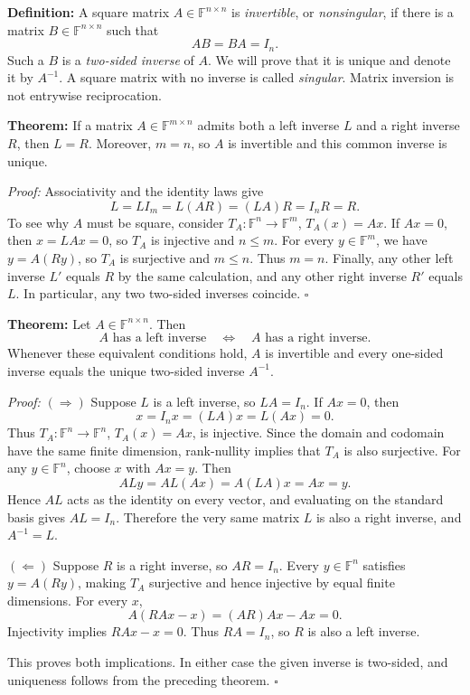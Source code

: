 \documentclass[a4paper,11pt,abstract=true]{scrartcl}
\theoremstyle{dotlessP}
\theoremstyle{dotlessS}
\theoremstyle{remark}
\theoremstyle{definition}
\begin{document}
\begin{definition_box}
\textbf{Definition:} A square matrix
$A\in\mathbb{F}^{n\times n}$ is \emph{invertible}, or
\emph{nonsingular}, if there is a matrix $B\in\mathbb{F}^{n\times n}$
such that
\[
AB=BA=I_n.
\]
Such a $B$ is a \emph{two-sided inverse} of $A$. We will prove that it
is unique and denote it by $A^{-1}$. A square matrix with no inverse is
called \emph{singular}. Matrix inversion is not entrywise reciprocation.
\end{definition_box}

\begin{problem_box}
\textbf{Theorem:} If a matrix
$A\in\mathbb{F}^{m\times n}$ admits both a left inverse $L$ and a
right inverse $R$, then $L=R$. Moreover, $m=n$, so $A$ is invertible
and this common inverse is unique.

\end{problem_box}

\begin{claim_box}
\textit{Proof:} Associativity and the identity laws give
\[
L=L I_m=L(AR)=(LA)R=I_n R=R.
\]
To see why $A$ must be square, consider
$T_A:\mathbb{F}^n\longrightarrow\mathbb{F}^m$, $T_A(x)=Ax$.
If $Ax=0$, then $x=LAx=0$, so $T_A$ is injective and $n\leq m$.
For every $y\in\mathbb{F}^m$, we have $y=A(Ry)$, so $T_A$ is
surjective and $m\leq n$. Thus $m=n$.
Finally, any other left inverse $L'$ equals $R$ by the same calculation,
and any other right inverse $R'$ equals $L$. In particular, any two
two-sided inverses coincide. \hfill$\square$
\end{claim_box}

\begin{problem_box}
\textbf{Theorem:}
Let
$A\in\mathbb{F}^{n\times n}$. Then
\[
A\text{ has a left inverse}
\quad\Longleftrightarrow\quad
A\text{ has a right inverse}.
\]
Whenever these equivalent conditions hold, $A$ is invertible and
every one-sided inverse equals the unique two-sided inverse $A^{-1}$.
\end{problem_box}

\begin{claim_box}
\textit{Proof:} $(\Rightarrow)$ Suppose $L$ is a left inverse,
so $LA=I_n$.
If $Ax=0$, then
\[
x=I_n x=(LA)x=L(Ax)=0.
\]
Thus $T_A:\mathbb{F}^n\longrightarrow\mathbb{F}^n$, $T_A(x)=Ax$,
is injective. Since the domain and codomain have the same finite
dimension, rank-nullity implies that $T_A$ is also surjective.
For any $y\in\mathbb{F}^n$, choose $x$ with $Ax=y$. Then
\[
ALy=AL(Ax)=A(LA)x=Ax=y.
\]
Hence $AL$ acts as the identity on every vector, and evaluating on
the standard basis gives $AL=I_n$. Therefore the very same matrix $L$
is also a right inverse, and $A^{-1}=L$.

$(\Leftarrow)$ Suppose $R$ is a right inverse, so $AR=I_n$. Every
$y\in\mathbb{F}^n$ satisfies $y=A(Ry)$, making $T_A$ surjective
and hence injective by equal finite dimensions. For every $x$,
\[
A(RAx-x)=(AR)Ax-Ax=0.
\]
Injectivity implies $RAx-x=0$. Thus $RA=I_n$, so $R$ is also a
left inverse.

This proves both implications. In either case the given inverse is
two-sided, and uniqueness follows from the preceding theorem.
\hfill$\square$
\end{claim_box}
\end{document}
